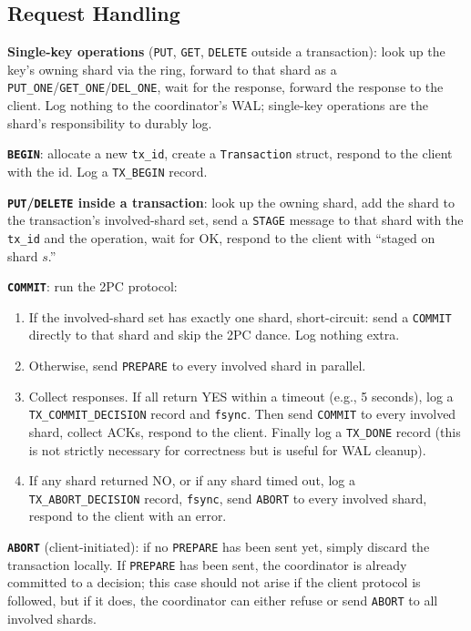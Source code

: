 \documentclass[11pt,a4paper]{article}
\begin{document}
\subsection{Request Handling}
\textbf{Single-key operations} (\texttt{PUT}, \texttt{GET}, \texttt{DELETE} outside a transaction): look up the key's owning shard via the ring, forward to that shard as a \texttt{PUT\_ONE}/\texttt{GET\_ONE}/\texttt{DEL\_ONE}, wait for the response, forward the response to the client. Log nothing to the coordinator's WAL; single-key operations are the shard's responsibility to durably log.

\textbf{\texttt{BEGIN}}: allocate a new \texttt{tx\_id}, create a \texttt{Transaction} struct, respond to the client with the id. Log a \texttt{TX\_BEGIN} record.

\textbf{\texttt{PUT}/\texttt{DELETE} inside a transaction}: look up the owning shard, add the shard to the transaction's involved-shard set, send a \texttt{STAGE} message to that shard with the \texttt{tx\_id} and the operation, wait for OK, respond to the client with ``staged on shard $s$.''

\textbf{\texttt{COMMIT}}: run the 2PC protocol:

\begin{enumerate}
\item If the involved-shard set has exactly one shard, short-circuit: send a \texttt{COMMIT} directly to that shard and skip the 2PC dance. Log nothing extra.

\item Otherwise, send \texttt{PREPARE} to every involved shard in parallel.

\item Collect responses. If all return YES within a timeout (e.g., 5 seconds), log a \texttt{TX\_COMMIT\_DECISION} record and \texttt{fsync}. Then send \texttt{COMMIT} to every involved shard, collect ACKs, respond to the client. Finally log a \texttt{TX\_DONE} record (this is not strictly necessary for correctness but is useful for WAL cleanup).

\item If any shard returned NO, or if any shard timed out, log a \texttt{TX\_ABORT\_DECISION} record, \texttt{fsync}, send \texttt{ABORT} to every involved shard, respond to the client with an error.
\end{enumerate}

\textbf{\texttt{ABORT}} (client-initiated): if no \texttt{PREPARE} has been sent yet, simply discard the transaction locally. If \texttt{PREPARE} has been sent, the coordinator is already committed to a decision; this case should not arise if the client protocol is followed, but if it does, the coordinator can either refuse or send \texttt{ABORT} to all involved shards.
\end{document}
